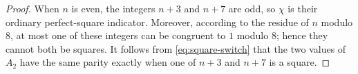 \documentclass[10pt,a4paper]{amsart}
\begin{document}
\begin{proof}
When $n$ is even, the integers $n+3$ and $n+7$ are odd, so $\chi$ is their ordinary perfect-square indicator.  Moreover, according to the residue of $n$ modulo $8$, at most one of these integers can be congruent to $1$ modulo $8$; hence they cannot both be squares.  It follows from \eqref{eq:square-switch} that the two values of $A_2$ have the same parity exactly when one of $n+3$ and $n+7$ is a square.
\end{proof}
\end{document}
